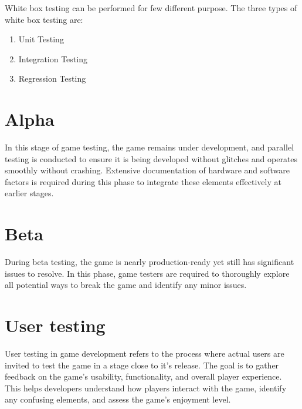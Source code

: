 \documentclass{article}
\begin{document}
White box testing can be performed for few different purpose. The three types of white box testing are:
\begin{enumerate}
	\item Unit Testing
	\item Integration Testing
	\item Regression Testing
\end{enumerate}

\section{Alpha}
In this stage of game testing, the game remains under development, and parallel testing is conducted to ensure it is being developed without glitches and operates smoothly without crashing. Extensive documentation of hardware and software factors is required during this phase to integrate these elements effectively at earlier stages.

\section{Beta}
During beta testing, the game is nearly production-ready yet still has significant issues to resolve. In this phase, game testers are required to thoroughly explore all potential ways to break the game and identify any minor issues.

\section{User testing}
User testing in game development refers to the process where actual users are invited to test the game in a stage close to it's release. The goal is to gather feedback on  the game's usability, functionality, and overall player experience. This helps developers understand how players interact with the game, identify any confusing elements, and assess the game's enjoyment level.
\end{document}

